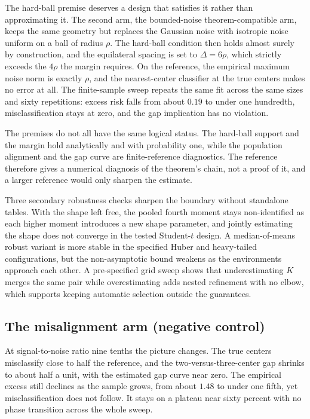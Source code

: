 The hard-ball premise deserves a design that satisfies it rather than
approximating it. The second arm, the bounded-noise theorem-compatible
arm, keeps the same geometry but replaces the Gaussian noise with
isotropic noise uniform on a ball of radius \(\rho\). The hard-ball
condition then holds almost surely by construction, and the equilateral
spacing is set to \(\Delta=6\rho\), which strictly exceeds the \(4\rho\)
the margin requires. On the reference, the empirical maximum noise norm
is exactly \(\rho\), and the nearest-center classifier at the true
centers makes no error at all. The finite-sample sweep repeats the same
fit across the same sizes and sixty repetitions: excess risk falls from
about \(0.19\) to under one hundredth, misclassification stays at zero,
and the gap implication has no violation.

The premises do not all have the same logical status. The hard-ball
support and the margin hold analytically and with probability one, while
the population alignment and the gap curve are finite-reference
diagnostics. The reference therefore gives a numerical diagnosis of the
theorem's chain, not a proof of it, and a larger reference would only
sharpen the estimate.

Three secondary robustness checks sharpen the boundary without
standalone tables. With the shape left free, the pooled fourth moment
stays non-identified as each higher moment introduces a new shape
parameter, and jointly estimating the shape does not converge in the
tested Student-\(t\) design. A median-of-means robust variant is more
stable in the specified Huber and heavy-tailed configurations, but the
non-asymptotic bound weakens as the environments approach each other. A
pre-specified grid sweep shows that underestimating \(K\) merges the
same pair while overestimating adds nested refinement with no elbow,
which supports keeping automatic selection outside the guarantees.

\subsection{The misalignment arm (negative
control)}\label{the-misalignment-arm-negative-control}

At signal-to-noise ratio nine tenths the picture changes. The true
centers misclassify close to half the reference, and the
two-versus-three-center gap shrinks to about half a unit, with the
estimated gap curve near zero. The empirical excess still declines as
the sample grows, from about \(1.48\) to under one fifth, yet
misclassification does not follow. It stays on a plateau near sixty
percent with no phase transition across the whole sweep.

